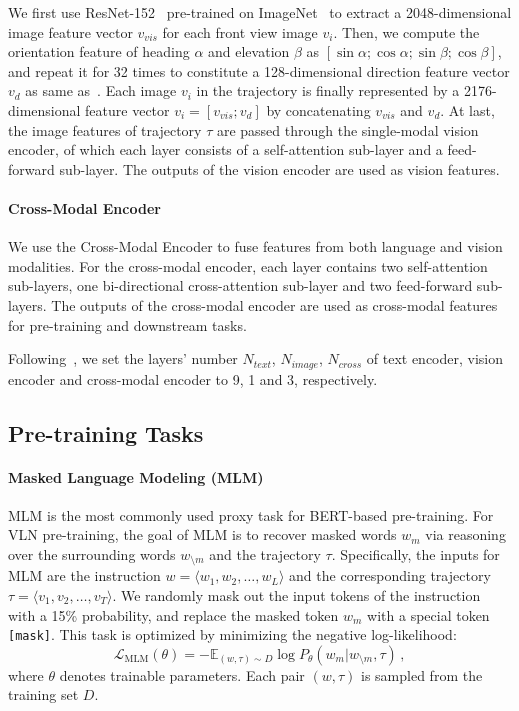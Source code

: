 \documentclass[10pt,twocolumn,letterpaper]{article}
\begin{document}
We first use ResNet-152~\cite{resnet} pre-trained on ImageNet~\cite{imagenet} to extract a 2048-dimensional image feature vector $v_{vis}$ for each front view image $v_i$. 
Then, we compute the orientation feature of heading $\alpha$ and elevation $\beta$ as $[\sin \alpha ; \cos \alpha ; \sin \beta; \cos \beta]$, and repeat it for 32 times to constitute a 128-dimensional direction feature vector $v_d$ as same as~\cite{envdrop}.
Each image $v_i$ in the trajectory is finally represented by a 2176-dimensional feature vector $ v_i = [v_{vis}; v_d]$ by concatenating $v_{vis}$ and $v_d$. 
At last, the image features of trajectory $\tau$ are passed through the single-modal vision encoder, of which each layer consists of a self-attention sub-layer and a feed-forward sub-layer. The outputs of the vision encoder are used as vision features.

\vspace{-8pt}
\paragraph{Cross-Modal Encoder}
We use the Cross-Modal Encoder to fuse features from both language and vision modalities. 
For the cross-modal encoder, each layer contains two self-attention sub-layers, one bi-directional cross-attention sub-layer and two feed-forward sub-layers. 
The outputs of the cross-modal encoder are used as cross-modal features for pre-training and downstream tasks.

Following~\cite{prevalent}, we set the layers' number $N_{text}$, $N_{image}$, $N_{cross}$ of text encoder, vision encoder and cross-modal encoder to 9, 1 and 3, respectively. 

\subsection{Pre-training Tasks}
\paragraph{Masked Language Modeling (MLM)} 
MLM is the most commonly used proxy task for BERT-based pre-training. For VLN pre-training, the goal of MLM is to recover masked words ${w_{m}}$ via reasoning over the surrounding words ${w_{\setminus m}}$ and the trajectory $\tau$.
Specifically, the inputs for MLM are the instruction $ w = \langle w_1, w_2,\dots,w_L \rangle$ and the corresponding trajectory $\tau = \langle v_1, v_2,\dots,v_T \rangle$. 
We randomly mask out the input tokens of the instruction with a 15\% probability, and replace the masked token ${w_m}$ with a special token \texttt{[mask]}.
This task is optimized by minimizing the negative log-likelihood:
\begin{equation}
    \mathcal{L}_{\text{MLM}}(\theta) = -\mathbb{E}_{({w}, {\tau})\sim D}\log P_{\theta}({w}_{m} | {w}_{\setminus {m}}, {\tau})\,,
\end{equation}
where $\theta$ denotes trainable parameters. 
Each pair $({w}, {\tau})$ is sampled from the training set $D$.
\end{document}
